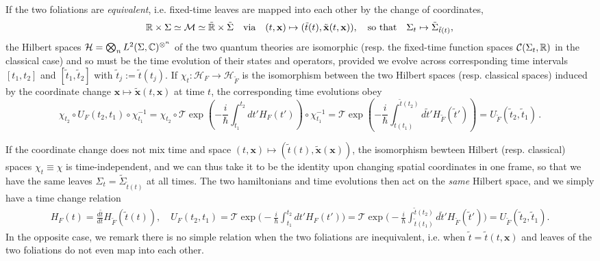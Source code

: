 \documentclass[../QFT_main.tex]{subfiles}
\begin{document}
\begin{mytheorem}
If the two foliations are \emph{equivalent}, i.e. fixed-time leaves are mapped into each other by the change of coordinates, 
\begin{align}
  \mathbb{R}\times \Sigma \simeq\mathcal{M}\simeq  \tilde{\mathbb{R}}\times \tilde{\Sigma} \quad \text{via}\quad (t,\mathbf{x}) \mapsto (\tilde{t}(t), \tilde{\mathbf{x}}(t,\mathbf{x})), \quad \text{so that}\quad \Sigma_t \mapsto \tilde{\Sigma}_{\tilde{t}(t)},
\end{align}
the Hilbert spaces $\mathcal{H}=\bigotimes_n L^2(\Sigma,\mathbb{C})^{\otimes^n}$ of the two quantum theories are isomorphic (resp. the fixed-time function spaces $\mathcal{C}(\Sigma_t,\mathbb{R})$ in the classical case) and so must be the time evolution of their states and operators, provided we evolve across corresponding time intervals $[t_1,t_2]$ and $[\tilde{t}_1,\tilde{t}_2]$ with $\tilde{t}_j:=\tilde{t}(t_j)$.
If $\chi_t: \mathcal{H}_F \to \mathcal{H}_{\tilde{F}}$ is the isomorphism between the two Hilbert spaces (resp. classical spaces) induced by the coordinate change $\mathbf{x}\mapsto \tilde{\mathbf{x}}(t,\mathbf{x})$ at time $t$, the corresponding time evolutions obey
{\small
\begin{equation}
  \chi_{t_2} \circ U_F(t_2,t_1)\circ \chi_{t_1}^{-1} 
  = \chi_{t_2} \circ \mathcal{T}\exp\left( -\frac{i}{\hbar}\int_{t_1}^{t_2} dt' H_F(t')\right)\circ \chi_{t_1}^{-1}
  = \mathcal{T}\exp\left( -\frac{i}{\hbar}\int_{\tilde{t}(t_1)}^{\tilde{t}(t_2)} d\tilde{t}' H_{\tilde{F}}(\tilde{t}')\right)
  = U_{\tilde{F}}(\tilde{t}_2,\tilde{t}_1)\,.
\end{equation}}

If the coordinate change does not mix time and space $(t,\mathbf{x})\mapsto (\tilde{t}(t),\tilde{\mathbf{x}}(\mathbf{x}))$, the isomorphism bewteen Hilbert (resp. classical) spaces $\chi_t\equiv \chi$ is time-independent, and we can thus take it to be the identity upon changing spatial coordinates in one frame, so that we have the same leaves $\Sigma_t=\tilde{\Sigma}_{\tilde{t}(t)}$ at all times.
The two hamiltonians and time evolutions then act on the \emph{same} Hilbert space, and we simply have a time change relation
{\small
\begin{align}
  H_F(t) = \tfrac{d\tilde{t}}{dt} H_{\tilde{F}}(\tilde{t}(t)), \quad
  U_F(t_2,t_1) = \mathcal{T}\exp\bigg( -\frac{i}{\hbar}\int_{t_1}^{t_2} dt' H_F(t')\bigg)
  = \mathcal{T}\exp\bigg( -\frac{i}{\hbar}\int_{\tilde{t}(t_1)}^{\tilde{t}(t_2)} d\tilde{t}' H_{\tilde{F}}(\tilde{t}')\bigg)
  = U_{\tilde{F}}(\tilde{t}_2,\tilde{t}_1).
\end{align}}
In the opposite case, we remark there is no simple relation when the two foliations are inequivalent, i.e. when $\tilde{t}=\tilde{t}(t,\mathbf{x})$ and leaves of the two foliations do not even map into each other.


\end{mytheorem}
\end{document}
